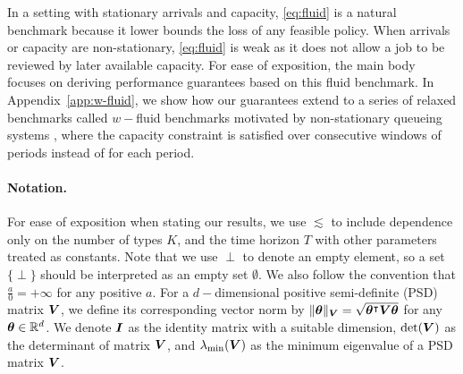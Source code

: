 \begin{remark}\label{remark:w-fluid}
In a setting with stationary arrivals and capacity, \eqref{eq:fluid} is a natural benchmark because it lower bounds the loss of any feasible policy. When arrivals or capacity are non-stationary, \eqref{eq:fluid} is weak as it does not allow a job to be reviewed by later available capacity. For ease of exposition, the main body focuses on deriving performance guarantees based on this fluid benchmark. In Appendix~\ref{app:w-fluid}, we show how our guarantees extend to a series of relaxed benchmarks called $w-$fluid benchmarks motivated by non-stationary queueing systems \citep{borodin2001adversarial, liang2018minimizing, yang2023learning, nguyen2023learning}, where the capacity constraint is satisfied over consecutive windows of periods instead of for each period. 
\end{remark}

\paragraph{Notation.} For ease of exposition when stating our results, we use $\lesssim$ to include dependence only on the number of types $K$, and the time horizon $T$ with other parameters treated as constants. Note that we use $\perp$ to denote an empty element, so a set $\{\perp\}$ should be interpreted as an empty set $\emptyset$. We also follow the convention that $\frac{a}{0} = +\infty$ for any positive $a$. 
For a $d-$dimensional positive semi-definite (PSD) matrix  $\boldsymbol{V}$, we define its corresponding vector norm by $\|\boldsymbol{\theta}\|_{\boldsymbol{V}} = \sqrt{\boldsymbol{\theta}^{\intercal}\boldsymbol{V}\boldsymbol{\theta}}$ for any $\boldsymbol{\theta} \in \mathbb{R}^d$. We denote $\boldsymbol{I}$ as the identity matrix with a suitable dimension, $\mathrm{det}(\boldsymbol{V})$ as the determinant of matrix $\boldsymbol{V}$, and $\lambda_{\min}(\boldsymbol{V})$ as the minimum eigenvalue of a PSD matrix $\boldsymbol{V}$.